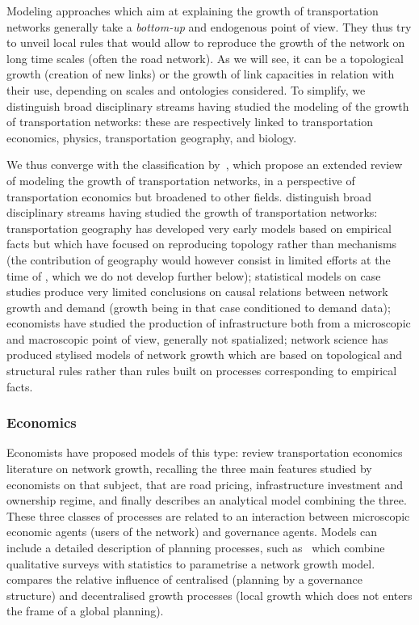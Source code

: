 \documentclass[10pt]{article}
\begin{document}
Modeling approaches which aim at explaining the growth of transportation networks generally take a \emph{bottom-up} and endogenous point of view. They thus try to unveil local rules that would allow to reproduce the growth of the network on long time scales (often the road network). As we will see, it can be a topological growth (creation of new links) or the growth of link capacities in relation with their use, depending on scales and ontologies considered. To simplify, we distinguish broad disciplinary streams having studied the modeling of the growth of transportation networks: these are respectively linked to transportation economics, physics, transportation geography, and biology.

We thus converge with the classification by~\cite{xie2009modeling}, which propose an extended review of modeling the growth of transportation networks, in a perspective of transportation economics but broadened to other fields. \cite{xie2009modeling} distinguish broad disciplinary streams having studied the growth of transportation networks: transportation geography has developed very early models based on empirical facts but which have focused on reproducing topology rather than mechanisms (the contribution of geography would however consist in limited efforts at the time of \cite{chorley1970network}, which we do not develop further below); statistical models on case studies produce very limited conclusions on causal relations between network growth and demand (growth being in that case conditioned to demand data); economists have studied the production of infrastructure both from a microscopic and macroscopic point of view, generally not spatialized; network science has produced stylised models of network growth which are based on topological and structural rules rather than rules built on processes corresponding to empirical facts.

\subsubsection{Economics}

Economists have proposed models of this type: \cite{zhang2007economics} review transportation economics literature on network growth, recalling the three main features studied by economists on that subject, that are road pricing, infrastructure investment and ownership regime, and finally describes an analytical model combining the three. These three classes of processes are related to an interaction between microscopic economic agents (users of the network) and governance agents. Models can include a detailed description of planning processes, such as~\cite{levinson2012forecasting} which combine qualitative surveys with statistics to parametrise a network growth model.  \cite{xie2009jurisdictional} compares the relative influence of centralised (planning by a governance structure) and decentralised growth processes (local growth which does not enters the frame of a global planning). 
\end{document}
